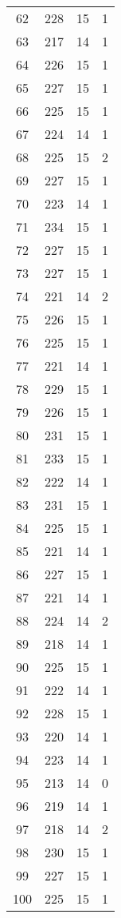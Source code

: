 \begin{longtable}[!]{c|ccc}
	62	& 228	& 15	& 1	\\
	63	& 217	& 14	& 1	\\
	64	& 226	& 15	& 1	\\
	65	& 227	& 15	& 1	\\
	66	& 225	& 15	& 1	\\
	67	& 224	& 14	& 1	\\
	68	& 225	& 15	& 2	\\
	69	& 227	& 15	& 1	\\
	70	& 223	& 14	& 1	\\
	71	& 234	& 15	& 1	\\
	72	& 227	& 15	& 1	\\
	73	& 227	& 15	& 1	\\
	74	& 221	& 14	& 2	\\
	75	& 226	& 15	& 1	\\
	76	& 225	& 15	& 1	\\
	77	& 221	& 14	& 1	\\
	78	& 229	& 15	& 1	\\
	79	& 226	& 15	& 1	\\
	80	& 231	& 15	& 1	\\
	81	& 233	& 15	& 1	\\
	82	& 222	& 14	& 1	\\
	83	& 231	& 15	& 1	\\
	84	& 225	& 15	& 1	\\
	85	& 221	& 14	& 1	\\
	86	& 227	& 15	& 1	\\
	87	& 221	& 14	& 1	\\
	88	& 224	& 14	& 2	\\
	89	& 218	& 14	& 1	\\
	90	& 225	& 15	& 1	\\
	91	& 222	& 14	& 1	\\
	92	& 228	& 15	& 1	\\
	93	& 220	& 14	& 1	\\
	94	& 223	& 14	& 1	\\
	95	& 213	& 14	& 0	\\
	96	& 219	& 14	& 1	\\
	97	& 218	& 14	& 2	\\
	98	& 230	& 15	& 1	\\
	99	& 227	& 15	& 1	\\
	100	& 225	& 15	& 1	\\
\end{longtable}


